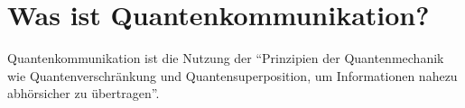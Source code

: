 \section{Was ist Quantenkommunikation?}
\begin{frame}[allowframebreaks]
	\begin{theorem}
		Quantenkommunikation ist die Nutzung der \enquote{Prinzipien der Quantenmechanik wie Quantenverschr{\"a}nkung und Quantensuperposition, um Informationen nahezu abh{\"o}rsicher zu {\"u}bertragen}.\cite{frauenhofer2025}
	\end{theorem}
\end{frame}